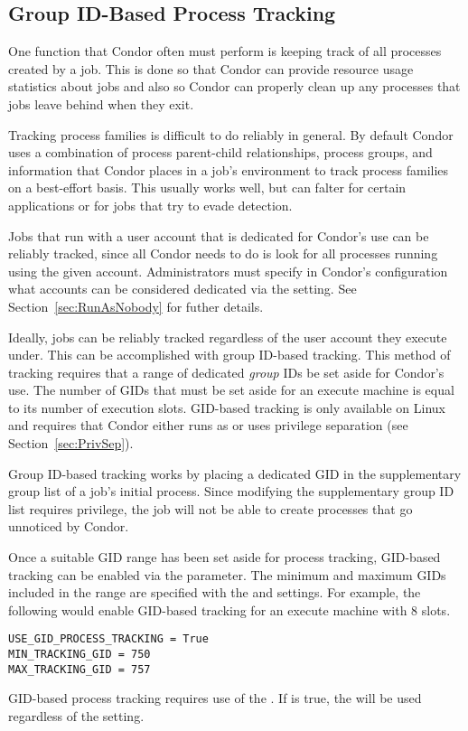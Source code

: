 \subsection{\label{sec:GroupTracking}Group ID-Based Process Tracking} 

One function that Condor often must perform is keeping track of all
processes created by a job. This is done so that Condor can provide
resource usage statistics about jobs and also so Condor can properly
clean up any processes that jobs leave behind when they exit.

Tracking process families is difficult to do reliably in
general. By default Condor uses a combination of process parent-child
relationships, process groups, and information that Condor places in a
job's environment to track process families on a best-effort
basis. This usually works well, but can falter for certain
applications or for jobs that try to evade detection.

Jobs that run with a user account that is dedicated for Condor's use
can be reliably tracked, since all Condor needs to do is look for all
processes running using the given account. Administrators must specify
in Condor's configuration what accounts can be considered dedicated
via the  setting. See
Section~\ref{sec:RunAsNobody} for futher details.

Ideally, jobs can be reliably tracked regardless of the user account
they execute under. This can be accomplished with group ID-based
tracking. This method of tracking requires that a range of dedicated
\emph{group} IDs be set aside for Condor's use. The number of GIDs
that must be set aside for an execute machine is equal to its number
of execution slots. GID-based tracking is only available on Linux and
requires that Condor either runs as  or uses privilege
separation (see Section~\ref{sec:PrivSep}).

Group ID-based tracking works by placing a dedicated GID in the
supplementary group list of a job's initial process. Since modifying
the supplementary group ID list requires
 privilege, the job will not be able to create processes
that go unnoticed by Condor.

Once a suitable GID range has been set aside for process tracking,
GID-based tracking can be enabled via the
 parameter. The minimum and maximum
GIDs included in the range are specified with the
 and 
settings. For example, the following would enable GID-based tracking
for an execute machine with 8 slots.
\begin{verbatim}
USE_GID_PROCESS_TRACKING = True
MIN_TRACKING_GID = 750
MAX_TRACKING_GID = 757
\end{verbatim}

GID-based process tracking requires use of the . If
 is true, the  will
be used regardless of the  setting.
